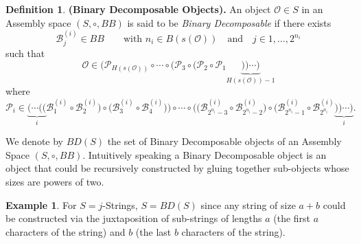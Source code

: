\documentclass[letterpaper,12pt]{article}
\theoremstyle{definition}
\newtheorem{exmp}{Example}[section]
\newtheorem{definition}{Definition}
\begin{document}
\begin{definition}\label{DefBDO}
    \textbf{(Binary Decomposable Objects).} An object $\mathscr{O} \in S$ in an Assembly space $(S,\circ,BB)$ is said to be \textit{Binary Decomposable} if there exists 
    \begin{equation}
        \mathscr{B}^{(i)}_{j} \in BB \qquad \text{with } n_i \in B(s(\mathscr{O})) \quad  \text{and} \quad j \in {1,\dots,2^{n_i}}
    \end{equation} 
    such that 
    \begin{equation}
        \mathscr{O} \in (\mathscr{P}_{H(s(\mathscr{O}))} \circ \cdots \circ  (\mathscr{P}_3 \circ (\mathscr{P}_{2} \circ \mathscr{P}_{1} \underbrace{)) \cdots)}_{H(s(\mathscr{O}))-1}
    \end{equation}
    where
    \begin{equation}\label{pieces}
        \mathscr{P}_i \in \underbrace{\big( \cdots \big( \big(}_{i} \mathscr{B}^{(i)}_1 \circ  \mathscr{B}^{(i)}_2 \big) \circ \big(\mathscr{B}^{(i)}_3 \circ \mathscr{B}^{(i)}_4 \big) \big) \circ \cdots \circ \big( \big( \mathscr{B}^{(i)}_{2^{n_i}-3} \circ  \mathscr{B}^{(i)}_{2^{n_i}-2} \big) \circ \big(  \mathscr{B}^{(i)}_{2^{n_i}-1} \circ  \mathscr{B}^{(i)}_{2^{n_i}}\underbrace{\big) \big) \cdots \big)}_{i}.
    \end{equation}
\end{definition} 
We denote by $BD(S)$ the set of Binary Decomposable objects of an Assembly Space $(S,\circ,BB)$. Intuitively speaking a Binary Decomposable object is an object that could be recursively constructed by gluing together sub-objects whose sizes are powers of two.  


\begin{exmp}
For $S=j$-Strings, $S=BD(S)$ since any string of size $a+b$ could be constructed via the juxtaposition of sub-strings of lengths $a$ (the first $a$ characters of the string) and $b$ (the last $b$ characters of the string).
\end{exmp}
\end{document}
